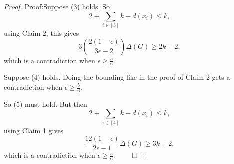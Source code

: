 \documentclass[12pt]{amsart}
\theoremstyle{plain}
\theoremstyle{definition}
\theoremstyle{remark}
\newcommand{\irange}[1]{\left[#1\right]}
\newcommand{\parens}[1]{\left( #1 \right)}
\newenvironment{claimproof}[1]{\par\noindent\underline{Proof:}\space#1}{\leavevmode\unskip\penalty9999
\hbox{}\nobreak\hfill\quad\hbox{$\qed$}}
\begin{document}
\begin{proof}
\begin{claimproof}
Suppose (3) holds.  So
\[2 + \sum_{i \in \irange{3}} k - d(x_i) \le k,\]
using Claim 2, this gives
\[3\parens{\frac{2(1-\epsilon)}{3\epsilon - 2}}\Delta(G) \ge 2k+2,\]
which is a contradiction when $\epsilon \ge \frac56$.

Suppose (4) holds.  Doing the bounding like in the proof of Claim 2 gets a contradiction when $\epsilon \ge \frac56$.


So (5) must hold.  But then
\[2 + \sum_{i \in \irange{4}} k - d(x_i) \le k,\]
using Claim 1 gives
\[\frac{12(1-\epsilon)}{2\epsilon -1}\Delta(G) \ge 3k+2,\]
which is a contradiction when $\epsilon \ge \frac{5}{6}$.
\end{claimproof}

\end{proof}

\newpage
\end{document}
